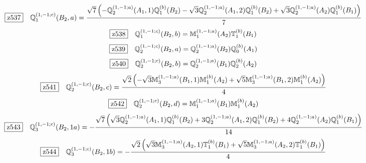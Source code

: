 \documentclass[fleqn,10pt,landscape]{jsarticle}
\begin{document}
\begin{dmath*}
\hspace*{3mm}\fbox{z537}\quad \mathbb{Q}_{1}^{(1,-1;c)}(B_{2},a)=\frac{\sqrt{7} \left(- \mathbb{Q}_{2}^{(1,-1;a)}(A_{1},1) \mathbb{Q}_{1}^{(b)}(B_{2}) - \sqrt{3} \mathbb{Q}_{2}^{(1,-1;a)}(A_{1},2) \mathbb{Q}_{1}^{(b)}(B_{2}) + \sqrt{3} \mathbb{Q}_{2}^{(1,-1;a)}(A_{2}) \mathbb{Q}_{1}^{(b)}(B_{1})\right)}{7}
\end{dmath*}
\begin{dmath*}
\hspace*{3mm}\fbox{z538}\quad \mathbb{Q}_{1}^{(1,-1;c)}(B_{2},b)=\mathbb{M}_{1}^{(1,-1;a)}(A_{2}) \mathbb{T}_{1}^{(b)}(B_{1})
\end{dmath*}
\begin{dmath*}
\hspace*{3mm}\fbox{z539}\quad \mathbb{Q}_{2}^{(1,-1;c)}(B_{2},a)=\mathbb{Q}_{2}^{(1,-1;a)}(B_{2}) \mathbb{Q}_{0}^{(b)}(A_{1})
\end{dmath*}
\begin{dmath*}
\hspace*{3mm}\fbox{z540}\quad \mathbb{Q}_{2}^{(1,-1;c)}(B_{2},b)=\mathbb{Q}_{2}^{(1,-1;a)}(B_{1}) \mathbb{Q}_{2}^{(b)}(A_{2})
\end{dmath*}
\begin{dmath*}
\hspace*{3mm}\fbox{z541}\quad \mathbb{Q}_{2}^{(1,-1;c)}(B_{2},c)=\frac{\sqrt{2} \left(- \sqrt{3} \mathbb{M}_{3}^{(1,-1;a)}(B_{1},1) \mathbb{M}_{1}^{(b)}(A_{2}) + \sqrt{5} \mathbb{M}_{3}^{(1,-1;a)}(B_{1},2) \mathbb{M}_{1}^{(b)}(A_{2})\right)}{4}
\end{dmath*}
\begin{dmath*}
\hspace*{3mm}\fbox{z542}\quad \mathbb{Q}_{2}^{(1,-1;c)}(B_{2},d)=\mathbb{M}_{1}^{(1,-1;a)}(B_{1}) \mathbb{M}_{1}^{(b)}(A_{2})
\end{dmath*}
\begin{dmath*}
\hspace*{3mm}\fbox{z543}\quad \mathbb{Q}_{3}^{(1,-1;c)}(B_{2},1a)=- \frac{\sqrt{7} \left(\sqrt{3} \mathbb{Q}_{2}^{(1,-1;a)}(A_{1},1) \mathbb{Q}_{1}^{(b)}(B_{2}) + 3 \mathbb{Q}_{2}^{(1,-1;a)}(A_{1},2) \mathbb{Q}_{1}^{(b)}(B_{2}) + 4 \mathbb{Q}_{2}^{(1,-1;a)}(A_{2}) \mathbb{Q}_{1}^{(b)}(B_{1})\right)}{14}
\end{dmath*}
\begin{dmath*}
\hspace*{3mm}\fbox{z544}\quad \mathbb{Q}_{3}^{(1,-1;c)}(B_{2},1b)=- \frac{\sqrt{2} \left(\sqrt{3} \mathbb{M}_{3}^{(1,-1;a)}(A_{2},1) \mathbb{T}_{1}^{(b)}(B_{1}) + \sqrt{5} \mathbb{M}_{3}^{(1,-1;a)}(A_{2},2) \mathbb{T}_{1}^{(b)}(B_{1})\right)}{4}
\end{dmath*}
\end{document}
